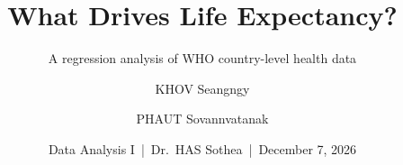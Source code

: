 \usepackage[T1]{fontenc}
\usepackage{amssymb}
\usepackage{booktabs,array,tabularx}
\usepackage{tikz}
\usetikzlibrary{shapes.geometric,arrows.meta,positioning}
\title[Life Expectancy]{What Drives Life Expectancy?}
\subtitle{A regression analysis of WHO country-level health data}
\author[KHOV \& PHAUT]{KHOV Seangngy \and PHAUT Sovannvatanak}
\date[Nov 28, 2026]{Data Analysis I \,|\, Dr.\ HAS Sothea \,|\, December 7, 2026}
\newcommand{\stat}[2]{\begin{tikzpicture}\node[draw=aupp,fill=aupp!8,rounded corners=3pt,minimum width=2.9cm,minimum height=1.5cm,align=center]{{\Large\bfseries\color{aupp}#1}\\[-1pt]{\footnotesize #2}};\end{tikzpicture}}
